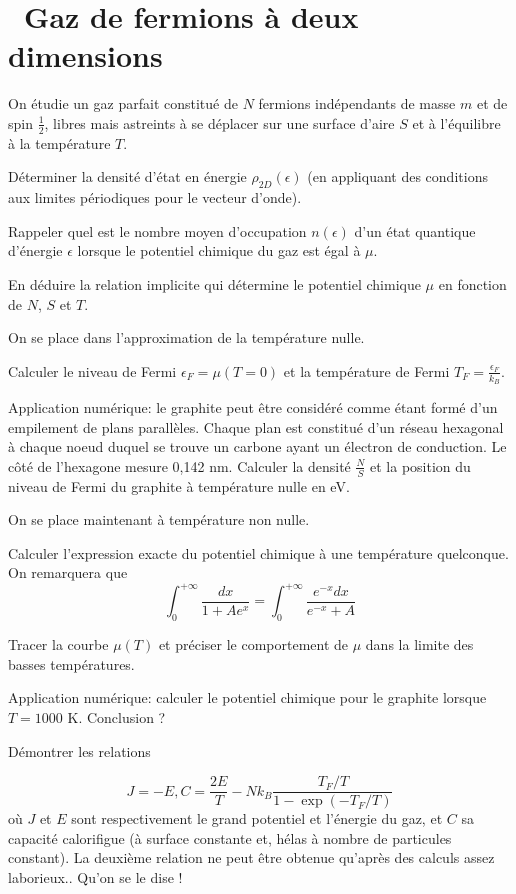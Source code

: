 \documentclass[utf8, 11pt]{feuille}
\begin{document}




\section{\medium~Gaz de fermions à deux dimensions}

On étudie un gaz parfait constitué de $N$ fermions indépendants de masse $m$ et de spin $\frac{1}{2}$, libres mais astreints à se déplacer sur une surface d'aire $S$ et à l'équilibre à la température $T$.

\question
Déterminer la densité d'état en énergie $\rho_{2D}(\epsilon)$ (en appliquant des conditions aux limites périodiques pour le vecteur d'onde). 

\question
Rappeler quel est le nombre moyen d'occupation $n(\epsilon)$ d'un état quantique d'énergie $\epsilon$ lorsque le potentiel chimique du gaz est égal à $\mu$.

\question
En déduire la relation implicite qui détermine le potentiel chimique $\mu$ en fonction de $N$, $S$ et $T$.

\medskip

On se place dans l'approximation de la température nulle.

\question
Calculer le niveau de Fermi $\epsilon_F=\mu(T=0)$ et la température de Fermi $T_F=\frac{\epsilon_F}{k_B}$.

\question
Application numérique: le graphite peut être considéré comme étant formé d'un empilement de plans parallèles. Chaque plan est constitué d'un réseau hexagonal à chaque noeud duquel se trouve un carbone ayant un électron de conduction. Le côté de l'hexagone mesure 0,142 nm. Calculer la densité $\frac{N}{S}$ et la position du niveau de Fermi du graphite à température nulle en eV.

\medskip

On se place maintenant à température non nulle.

\question
Calculer l'expression exacte du potentiel chimique à une température quelconque. On remarquera que
$$
\int_0^{+\infty} \frac{dx}{1+A e^x}=\int_0^{+\infty} \frac{e^{-x}dx}{e^{-x}+A}
$$

\question
Tracer la courbe $\mu(T)$ et préciser le comportement de $\mu$ dans la limite des basses températures.

\question
Application numérique: calculer le potentiel chimique pour le graphite lorsque $T=1000$ K. Conclusion ?

\question
Démontrer les relations

$$
J=-E,   C=\frac{2E}{T}- Nk_B\frac{T_F/T}{1-\exp(-T_F/T)}
$$
où $J$ et $E$ sont respectivement le grand potentiel et l'énergie du gaz, et $C$ sa capacité calorifigue (à surface constante et, hélas à nombre de particules constant). La deuxième relation ne peut être obtenue qu'après des calculs assez laborieux.. Qu'on se le dise !
\end{document}

